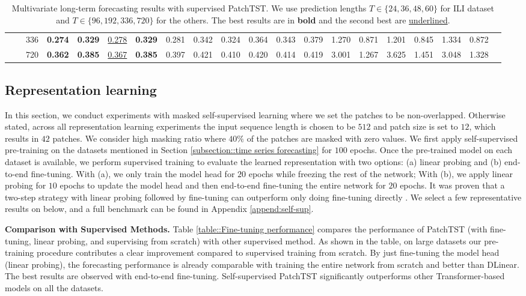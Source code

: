 \documentclass{article} %
\begin{document}
\begin{table}[t]
{\begin{tabular}{cc|c|cc|cc|cc|cc|cc|cc|cc|ccc}
            &\multicolumn{1}{c|}{}& 336   & \textbf{0.274} & \textbf{0.329} & \uline{0.278} & \textbf{0.329} & 0.281 & 0.342 & 0.324 & 0.364 & 0.343 & 0.379 & 1.270 & 0.871 & 1.201 & 0.845 & 1.334 & 0.872 \\
            &\multicolumn{1}{c|}{}& 720   & \textbf{0.362} & \textbf{0.385} & \uline{0.367} & \textbf{0.385} & 0.397 & 0.421 & 0.410 & 0.420 & 0.414 & 0.419 & 3.001 & 1.267 & 3.625 & 1.451 & 3.048 & 1.328 \\
			\cline{2-19}
		\end{tabular}
	}
	\caption{Multivariate long-term forecasting results with supervised PatchTST. We use prediction lengths $T\in \{24, 36, 48, 60\}$ for ILI dataset and $T\in \{96, 192, 336, 720\}$ for the others. The best results are in \textbf{bold} and the second best are \uline{underlined}.}
	\label{tab:supervised}
\end{table}
\linespread{1}


\subsection{Representation learning}

In this section, we conduct experiments with masked self-supervised learning where we set the patches to be non-overlapped. Otherwise stated, across all representation learning experiments the input sequence length is chosen to be $512$ and patch size is set to $12$, which results in $42$ patches. We consider high masking ratio where $40 \%$ of the patches are masked with zero values. We first apply self-supervised pre-training on the datasets mentioned in Section \ref{subsection::time series forecasting} for $100$ epochs. Once the pre-trained model on each dataset is available, we perform supervised training to evaluate the learned representation with two options: (a) linear probing and (b) end-to-end fine-tuning. With (a), we only train the model head for $20$ epochs while freezing the rest of the network; With (b), we apply linear probing for $10$ epochs to update the model head and then end-to-end fine-tuning the entire network for $20$ epochs. It was proven that a two-step strategy with linear probing followed by fine-tuning can outperform only doing fine-tuning directly \citep{lp-ft}. We select a few representative results on below, and a full benchmark can be found in Appendix \ref{append:self-sup}.

\textbf{Comparison with Supervised Methods.} Table \ref{table::Fine-tuning performance} compares the performance of PatchTST (with fine-tuning, linear probing, and supervising from scratch) with other supervised method. As shown in the table, on large datasets our pre-training procedure contributes a clear improvement compared to supervised training from scratch. By just fine-tuning the model head (linear probing), the forecasting performance is already comparable with training the entire network from scratch and better than DLinear. The best results are observed with end-to-end fine-tuning. Self-supervised PatchTST significantly outperforms other Transformer-based models on all the datasets. 
\end{document}
